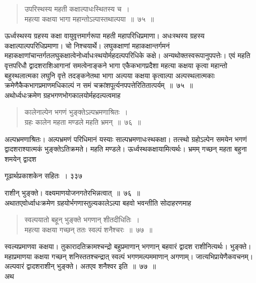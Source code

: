 \documentclass[11pt, openany]{book}
\begin{document}
 \begin{quote}
{\ssi उपरिस्थस्य महती कक्षाल्पाधःस्थितस्य च~।\\ 
महत्या कक्षया भागा महान्तोऽल्पास्तथाल्पया~॥~७५~॥ }
\end{quote}
 ऊर्ध्वस्थस्य ग्रहस्य कक्षा वायुवृत्तमार्गरूपा महती महापरिधिप्रमाणा। अधःस्थस्य ग्रहस्य कक्षाल्पाल्पपरिधिप्रमाणा। चो निश्चयार्थे। लघुकक्षाणां महाकक्षान्तर्गमनं महाकक्षाणांचान्तर्गतलघुकक्षात्वेनोर्ध्वाधःस्थयोर्महदल्पपरिधिके कक्षे। अन्यथोक्तस्वरूपानुपपत्तेः। एवं महति वृत्तपरिधौ द्वादशराशिआगानां समत्वेनाङ्कने भागा एकैकभागप्रदैशा महत्या कक्षया कृत्वा महान्तो बहुस्थलात्मका लघुनि वृत्ते तदङ्कनेतथा भागा अल्पया कक्षया कृत्वाल्पा अल्पस्थलात्मकाः क्रमेणैकैकभागप्रमाणमधिकाल्पं न समं चक्रांशपूर्त्यनपपत्तेरितितात्पर्यम्~॥~७५~॥\\
\noindent अथोर्ध्वधःक्रमेण ग्रहभगणभोगकालयोर्महदल्पत्वमाह \textendash


\begin{quote}
{\ssi कालेनाल्पेन भगणं भुङ्क्तेऽल्पभ्रमणाश्रितः~।\\
ग्रहः कालेन महता मण्डले महति भ्रमन्~॥~७६~॥}
\end{quote}
 अल्पभ्रमणाश्रितः। अल्पभ्रमणं परिधिमानं यस्याः साल्पभ्रमणाधःस्थकक्षा। तत्स्थो ग्रहोऽल्पेन समयेन भगणं द्वादशराश्यात्मकं भुङ्क्तेऽतिक्रमते। महति मण्डले। ऊर्ध्वस्थकक्षायामित्यर्थः। भ्रमम् गच्छन् महता बहुना शमयेन् द्वादश \textendash



\newpage


\hspace{3cm} गूढार्थप्रकाशकेन सहितः~। \hfill ३३७
\vspace{1cm}


\noindent राशीन् भुङ्क्ते। वक्ष्यमाणयोजनगतेरभिन्नत्वात्~॥~७६~॥ \\
\noindent अथातएवोर्ध्वाधःक्रमेण ग्रहयोर्भगणास्तुल्यकालेऽल्पा बहवो भवन्तीति सोदाहरणमाह \textendash 


\begin{quote}
{\ssi स्वल्पयातो बहून् भुङ्क्ते भगणान् शीतदीधितिः~। \\
महत्या कक्षया गच्छन् ततः स्वल्पं शनैश्चरः~॥~७७~॥}
\end{quote}
 स्वल्यप्रमाणवा कक्षया। तुकारादतिक्रामश्चन्द्रो बहुप्रमाणान् भगणान् बहवारं द्वादश राशीनित्यर्थः। भुङ्क्ते। महाप्रमाणया कक्षया गच्छन् शनिस्ततश्चन्द्रात् स्वल्पं भगणमल्पममाणान् अगणाम्। जात्यभिप्रायेणैकवचनम्। अल्पवारं द्वादशराशीन् भुङ्क्ते। अतएव शनैश्वर इति~॥~७७~॥\\
 अथ \textendash
\end{document}
